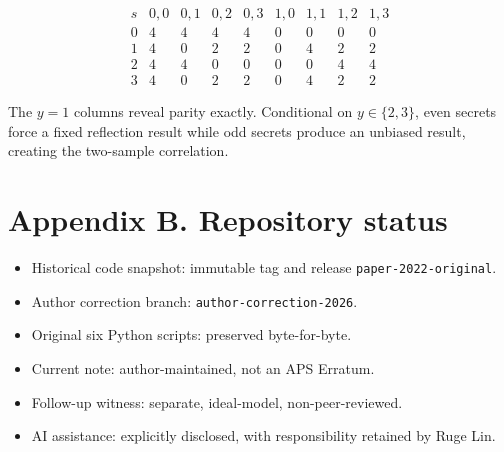 \documentclass[
  10pt,
]{article}
\providecommand{\tightlist}{%
  \setlength{\itemsep}{0pt}\setlength{\parskip}{0pt}}
\begin{document}
\[
\begin{array}{c|rrrrrrrr}
s&0,0&0,1&0,2&0,3&1,0&1,1&1,2&1,3\\\hline
0&4&4&4&4&0&0&0&0\\
1&4&0&2&2&0&4&2&2\\
2&4&4&0&0&0&0&4&4\\
3&4&0&2&2&0&4&2&2
\end{array}
\]

The \(y=1\) columns reveal parity exactly. Conditional on
\(y\in\{2,3\}\), even secrets force a fixed reflection result while odd
secrets produce an unbiased result, creating the two-sample correlation.

\section{Appendix B. Repository
status}\label{appendix-b.-repository-status}

\begin{itemize}
\tightlist
\item
  Historical code snapshot: immutable tag and release
  \texttt{paper-2022-original}.
\item
  Author correction branch: \texttt{author-correction-2026}.
\item
  Original six Python scripts: preserved byte-for-byte.
\item
  Current note: author-maintained, not an APS Erratum.
\item
  Follow-up witness: separate, ideal-model, non-peer-reviewed.
\item
  AI assistance: explicitly disclosed, with responsibility retained by
  Ruge Lin.
\end{itemize}
\end{document}

